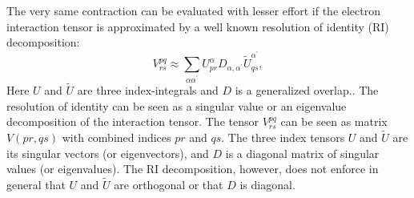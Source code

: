 The very same contraction can be evaluated with lesser effort if the electron 
interaction tensor is approximated by a well known\cite{beebe1977, 
vahtras1993integral, boman2008method, sierka2003fast} resolution of identity 
(RI) decomposition:
%
\begin{equation} V^{pq}_{rs} \approx \sum_{\alpha \alpha^{\prime}} 
U_{pr}^{\alpha}
D_{\alpha,\alpha^{\prime}} \tilde{U}_{qs}^{\alpha^{\prime}},
\label{eq:ri_decomposition}
\end{equation}
Here $U$ and $\tilde{U}$ are three index-integrals and $D$ is a generalized 
overlap.\cite{ahmadi1995coulomb}. The resolution of identity can be 
seen as a singular value or an eigenvalue decomposition of the 
interaction tensor. The tensor $V^{pq}_{rs}$ can be seen as matrix 
$V(pr, qs)$ with combined indices $pr$ and $qs$. The three index tensors $U$ and 
$\tilde{U}$ are its singular vectors (or eigenvectors), and $D$ is a diagonal 
matrix of singular values (or eigenvalues). The RI decomposition, however, does 
not enforce in general that $U$ and $\tilde{U}$ are orthogonal or that $D$ is 
diagonal.

